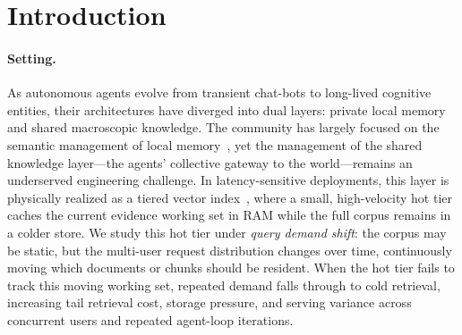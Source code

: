 %

\section{Introduction}

\paragraph{Setting.} As autonomous agents evolve from transient chat-bots to long-lived cognitive entities, their architectures have diverged into dual layers: private local memory and shared macroscopic knowledge. The community has largely focused on the semantic management of local memory~\cite{hu2025memory,weng2025amem}, yet the management of the shared knowledge layer---the agents' collective gateway to the world---remains an underserved engineering challenge. In latency-sensitive deployments, this layer is physically realized as a tiered vector index~\cite{jayaram2019diskann,malkov2018efficient}, where a small, high-velocity hot tier caches the current evidence working set in RAM while the full corpus remains in a colder store. We study this hot tier under \emph{query demand shift}: the corpus may be static, but the multi-user request distribution changes over time, continuously moving which documents or chunks should be resident. When the hot tier fails to track this moving working set, repeated demand falls through to cold retrieval, increasing tail retrieval cost, storage pressure, and serving variance across concurrent users and repeated agent-loop iterations.


